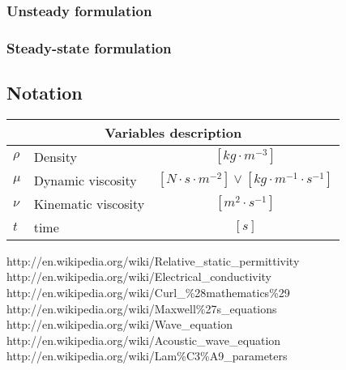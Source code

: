 \documentclass[a4paper,10pt]{book}
\begin{document}
\subsubsection{Unsteady formulation}

\subsubsection{Steady-state formulation}

\subsection{Notation}

\begin{tabular}{|l|l|c|}
    \hline
    \multicolumn{3}{|c|}{Variables description} \\
    \hline
    $\rho$ & Density & $[kg\cdot{m^{-3}}]$ \\
    $\mu$ & Dynamic viscosity & $[N \cdot s \cdot m^{-2}] \vee [kg \cdot m^{-1} \cdot s^{-1}]$ \\
    $\nu$ & Kinematic viscosity & $[m^2 \cdot s^{-1}]$ \\
    $t$ & time & $[s]$ \\
    \hline
\end{tabular}

\backmatter

\begin{thebibliography}{9}
        http://en.wikipedia.org/wiki/Relative\_static\_permittivity
        http://en.wikipedia.org/wiki/Electrical\_conductivity
        http://en.wikipedia.org/wiki/Curl\_\%28mathematics\%29
        http://en.wikipedia.org/wiki/Maxwell\%27s\_equations
        http://en.wikipedia.org/wiki/Wave\_equation
        http://en.wikipedia.org/wiki/Acoustic\_wave\_equation
        http://en.wikipedia.org/wiki/Lam\%C3\%A9\_parameters
\end{thebibliography}

\printindex
\end{document}
